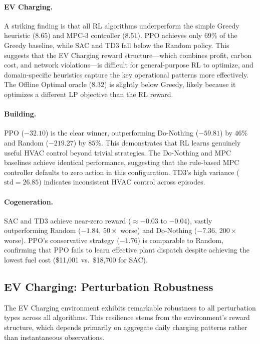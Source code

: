 \paragraph{EV Charging.} A striking finding is that all RL algorithms underperform the simple Greedy heuristic ($8.65$) and MPC-3 controller ($8.51$). PPO achieves only $69\%$ of the Greedy baseline, while SAC and TD3 fall below the Random policy. This suggests that the EV Charging reward structure---which combines profit, carbon cost, and network violations---is difficult for general-purpose RL to optimize, and domain-specific heuristics capture the key operational patterns more effectively. The Offline Optimal oracle ($8.32$) is slightly below Greedy, likely because it optimizes a different LP objective than the RL reward.

\paragraph{Building.} PPO ($-32.10$) is the clear winner, outperforming Do-Nothing ($-59.81$) by $46\%$ and Random ($-219.27$) by $85\%$. This demonstrates that RL learns genuinely useful HVAC control beyond trivial strategies. The Do-Nothing and MPC baselines achieve identical performance, suggesting that the rule-based MPC controller defaults to zero action in this configuration. TD3's high variance ($\text{std} = 26.85$) indicates inconsistent HVAC control across episodes.

\paragraph{Cogeneration.} SAC and TD3 achieve near-zero reward ($\approx -0.03$ to $-0.04$), vastly outperforming Random ($-1.84$, $50\times$ worse) and Do-Nothing ($-7.36$, $200\times$ worse). PPO's conservative strategy ($-1.76$) is comparable to Random, confirming that PPO fails to learn effective plant dispatch despite achieving the lowest fuel cost (\$11,001 vs.\ \$18,700 for SAC).

\subsection{EV Charging: Perturbation Robustness}
\label{sec:noise_ev}

The EV Charging environment exhibits remarkable robustness to all perturbation types across all algorithms. This resilience stems from the environment's reward structure, which depends primarily on aggregate daily charging patterns rather than instantaneous observations.

